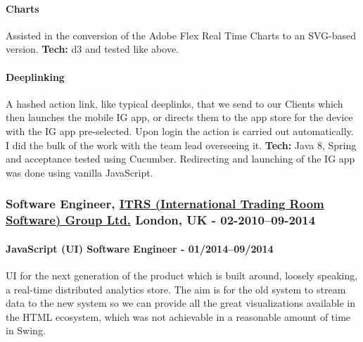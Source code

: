 \documentclass[
  a4paper,
]{article}
\begin{document}
\begin{multicols*}{2}
\hypertarget{charts}{%
\paragraph{Charts}\label{charts}}

Assisted in the conversion of the Adobe Flex Real Time Charts to an
SVG-based version. \textbf{Tech:} d3 and tested like above.

\hypertarget{deeplinking}{%
\paragraph{Deeplinking}\label{deeplinking}}

A hashed action link, like typical deeplinks, that we send to our
Clients which then launches the mobile IG app, or directs them to the
app store for the device with the IG app pre-selected. Upon login the
action is carried out automatically. I did the bulk of the work with the
team lead overseeing it. \textbf{Tech:} Java 8, Spring and acceptance
tested using Cucumber. Redirecting and launching of the IG app was done
using vanilla JavaScript.

\hypertarget{software-engineer-itrs-international-trading-room-software-group-ltd.-london-uk---02-201009-2014}{%
\subsubsection{\texorpdfstring{Software Engineer,
\href{https://www.itrsgroup.com}{ITRS (International Trading Room
Software) Group Ltd.} London, UK -
02-2010--09-2014}{Software Engineer, ITRS (International Trading Room Software) Group Ltd. London, UK - 02-2010--09-2014}}\label{software-engineer-itrs-international-trading-room-software-group-ltd.-london-uk---02-201009-2014}}

\hypertarget{javascript-ui-software-engineer---012014092014}{%
\paragraph{JavaScript (UI) Software Engineer -
01/2014--09/2014}\label{javascript-ui-software-engineer---012014092014}}

UI for the next generation of the product which is built around, loosely
speaking, a real-time distributed analytics store. The aim is for the
old system to stream data to the new system so we can provide all the
great visualizations available in the HTML ecosystem, which was not
achievable in a reasonable amount of time in Swing.


\end{multicols*}
\end{document}

